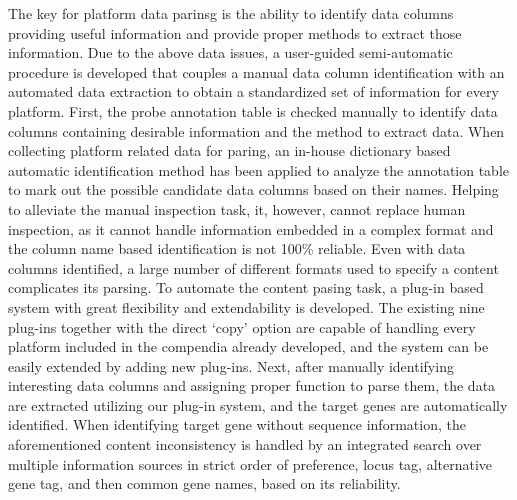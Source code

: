 The key for platform data parinsg is the ability to identify data columns
providing useful information and provide proper methods to extract those
information.
%
Due to the above data issues, a user-guided semi-automatic procedure is
developed that couples a manual data column identification with an automated
data extraction to obtain a standardized set of information for every
platform.
%
First, the probe annotation table is checked manually to identify data
columns containing desirable information and the method to extract
data.
%
When collecting platform related data for paring, an in-house dictionary
based automatic identification method has been applied to analyze the
annotation table to mark out the possible candidate data columns based on
their names.
%
Helping to alleviate the manual inspection task, it, however, cannot replace
human inspection, as it cannot handle information embedded in a complex
format and the column name based identification is not 100\% reliable.
%
Even with data columns identified, a large number of different formats used
to specify a content complicates its parsing.
To automate the content pasing task, a plug-in based system with great
flexibility and extendability is developed.
%
The existing nine plug-ins together with the direct `copy' option are
capable of handling every platform included in the compendia already
developed, and the system can be easily extended by adding new plug-ins.
%
Next, after manually identifying interesting data columns and assigning
proper function to parse them, the data are extracted utilizing our plug-in
system, and the target genes are automatically identified.
%
When identifying target gene without sequence information, the aforementioned
content inconsistency is handled by an integrated search over multiple
information sources in strict order of preference, locus tag, alternative gene
tag, and then common gene names, based on its reliability.




